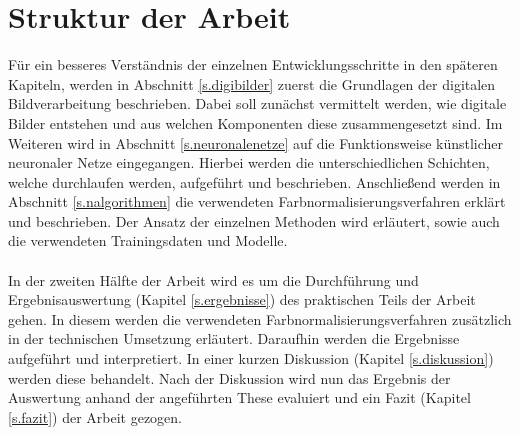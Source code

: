   \section{Struktur der Arbeit}\label{Struktur} 
Für ein besseres Verständnis der einzelnen Entwicklungsschritte in den späteren Kapiteln, werden in Abschnitt \ref{s.digibilder} zuerst die Grundlagen der digitalen Bildverarbeitung beschrieben. Dabei soll zunächst vermittelt werden, wie digitale Bilder entstehen und aus welchen Komponenten diese zusammengesetzt sind. Im Weiteren wird in Abschnitt \ref{s.neuronalenetze} auf die Funktionsweise künstlicher neuronaler Netze eingegangen. Hierbei werden die unterschiedlichen Schichten, welche durchlaufen werden, aufgeführt und beschrieben. Anschließend werden in Abschnitt \ref{s.nalgorithmen} die verwendeten Farbnormalisierungsverfahren erklärt und beschrieben. Der Ansatz der einzelnen Methoden wird erläutert, sowie auch die verwendeten Trainingsdaten und Modelle.\\\\
In der zweiten Hälfte der Arbeit wird es um die Durchführung und Ergebnisauswertung (Kapitel \ref{s.ergebnisse}) des praktischen Teils der Arbeit gehen. In diesem werden die verwendeten Farbnormalisierungsverfahren zusätzlich in der technischen Umsetzung erläutert. Daraufhin werden die Ergebnisse aufgeführt und interpretiert. In einer kurzen Diskussion (Kapitel \ref{s.diskussion}) werden diese behandelt. Nach der Diskussion wird nun das Ergebnis der Auswertung anhand der angeführten These evaluiert und ein Fazit (Kapitel \ref{s.fazit}) der Arbeit gezogen.